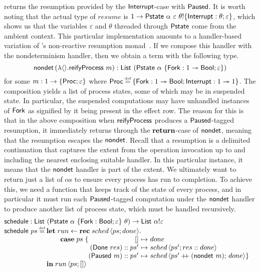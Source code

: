 \documentclass[12pt,phd,lfcs,twoside,openright,logo,leftchapter,normalheadings]{infthesis}
\theoremstyle{plain}
\theoremstyle{definition}
\begin{document}
returns the resumption provided by the $\mathsf{Interrupt}$-case with
$\mathsf{Paused}$.
%
It is worth noting that the actual type of $resume$ is
$1 \to \mathsf{Pstate}~\alpha~\varepsilon~\theta !
\{\mathsf{Interrupt}:\theta;\varepsilon\}$, which shows us that the variables
$\varepsilon$ and $\theta$ threaded through $\mathsf{Pstate}$ come from the
ambient context.
%
This particular implementation amounts to a handler-based variation of
\citeauthor{Harrison06}'s non-reactive resumption
monad~\cite{Harrison06}.
%
If we compose this handler with the nondeterminism
handler, then we obtain a term with the following type.
%
\[
  \mathsf{nondet}\,(\lambda\langle  \rangle.\mathsf{reifyProcess}~m) : \mathsf{List}~(\mathsf{Pstate}~\alpha~\{\mathsf{Fork}: 1 \twoheadrightarrow \mathsf{Bool};\varepsilon\})
\]
%
for some $m : 1 \to \{\mathsf{Proc};\varepsilon\}$ where
$\Proc \defas \{\Fork: \UnitType \opto \Bool;\Interrupt: \UnitType
\opto \UnitType\}$.
%
The composition yields a list of process states, some of which may be
in suspended state. In particular, the suspended computations may have
unhandled instances of $\mathsf{Fork}$ as signified by it being present in the
effect row. The reason for this is that in the above composition when
$\mathsf{reifyProcess}$ produces a $\mathsf{Paused}$-tagged resumption, it immediately
returns through the $\mathbf{return}$-case of $\mathsf{nondet}$, meaning that the
resumption escapes the $\mathsf{nondet}$. Recall that a resumption is a
delimited continuation that captures the extent from the operation
invocation up to and including the nearest enclosing suitable
handler. In this particular instance, it means that the $\mathsf{nondet}$
handler is part of the extent.
%
We ultimately want to return just a list of $\alpha$s to ensure every
process has run to completion. To achieve this, we need a function
that keeps track of the state of every process, and in particular it
must run each $\mathsf{Paused}$-tagged computation under the $\mathsf{nondet}$
handler to produce another list of process state, which must be
handled recursively.
%
\[
  \bl
    \schedule : \List~(\Pstate~\alpha~\{\Fork:\Bool;\varepsilon\}~\theta) \to \List~\alpha \eff \varepsilon\\
    \schedule~ps \defas
       \ba[t]{@{}l}
         \Let\;run \revto
             \Rec\;sched\,\Record{ps;done}.\\
              \qquad\Case\;ps\;\{
                  \ba[t]{@{}r@{~}c@{~}l}
                       \nil                  &\mapsto& done\\
                       (\Done~res) \cons ps' &\mapsto& sched\,\Record{ps';res \cons done}\\
                       (\Suspended~m) \cons ps' &\mapsto& sched\,\Record{ps' \concat (\nondet~m);\, done} \}
           \ea\\
           \In\;run\,\Record{ps;\nil}
       \ea
  \el
\]
\end{document}
